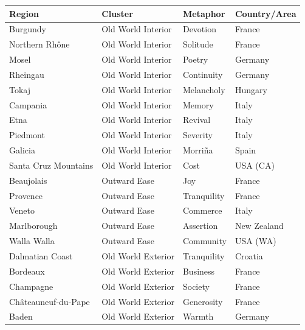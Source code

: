 \documentclass[11pt]{article}
\begin{document}
\begin{small}
\begin{longtable}{p{4.5cm} p{4cm} p{3cm} p{3cm}}
\toprule
\textbf{Region} & \textbf{Cluster} & \textbf{Metaphor} & \textbf{Country/Area} \\
\midrule
\endhead
Burgundy                 & Old World Interior      & Devotion       & France \\
Northern Rh\^one         & Old World Interior      & Solitude       & France \\
Mosel                    & Old World Interior      & Poetry         & Germany \\
Rheingau                 & Old World Interior      & Continuity     & Germany \\
Tokaj                    & Old World Interior      & Melancholy     & Hungary \\
Campania                 & Old World Interior      & Memory         & Italy \\
Etna                     & Old World Interior      & Revival        & Italy \\
Piedmont                 & Old World Interior      & Severity       & Italy \\
Galicia                  & Old World Interior      & Morri\~na      & Spain \\
Santa Cruz Mountains     & Old World Interior      & Cost           & USA (CA) \\
\midrule
Beaujolais               & Outward Ease            & Joy            & France \\
Provence                 & Outward Ease            & Tranquility    & France \\
Veneto                   & Outward Ease            & Commerce       & Italy \\
Marlborough              & Outward Ease            & Assertion      & New Zealand \\
Walla Walla              & Outward Ease            & Community      & USA (WA) \\
\midrule
Dalmatian Coast          & Old World Exterior      & Tranquility    & Croatia \\
Bordeaux                 & Old World Exterior      & Business       & France \\
Champagne                & Old World Exterior      & Society        & France \\
Ch\^ateauneuf-du-Pape    & Old World Exterior      & Generosity     & France \\
Baden                    & Old World Exterior      & Warmth         & Germany \\

\end{longtable}
\end{small}
\end{document}
